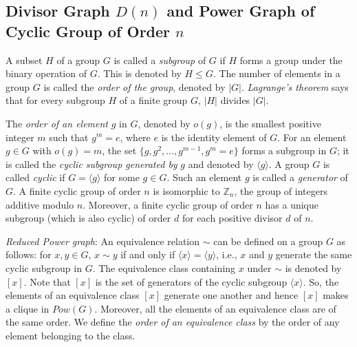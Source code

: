 \documentclass[twoside, 11pt]{article}
\begin{document}


\subsection{Divisor Graph $D(n)$ and Power Graph of Cyclic Group of Order $n$}\label{divisor and power}

  A subset $H$ of a group $G$ is called a \textit{subgroup} of $G$ if $H$ forms a group under the binary operation of $G$. This is denoted by $H \leq G$. The number of elements in a group $G$ is called the \textit{order of the group}, denoted by $|G|$. \textit{Lagrange's theorem} says that for every subgroup $H$ of a finite group $G$, $|H|$ divides $|G|$. 

The \textit{order of an element} $g$ in $G$, denoted by $o(g)$, is the smallest positive integer $m$ such that $g^m=e$, where $e$ is the identity element of $G$. For an element $g \in G$ with $o(g)=m$, the set $\{g, g^2, \dots, g^{m-1}, g^m=e\}$ forms a subgroup in $G$; it is called the \textit{cyclic subgroup generated by} $g$ and denoted by $\langle g \rangle$.
A group $G$ is called \emph{cyclic} if $G=\langle g \rangle$ for some $g\in G$. Such an element $g$ is called a \textit{generator} of $G$. A finite cyclic group of order $n$ is isomorphic to $\mathbb{Z}_n$, the group of integers additive modulo $n$. Moreover, a finite cyclic group of order $n$ has a unique subgroup (which is also cyclic) of order $d$ for each positive divisor $d$ of $n$.

\vspace{0.2cm}
 

\noindent \textit{Reduced Power graph}: 
An equivalence relation $\sim$ can be defined on a group $G$ as follows: for $x,y\in G$, $x\sim y$ if and only if $\langle x \rangle = \langle y \rangle$, i.e., $x$ and $y$ generate the same cyclic subgroup in $G$.  The equivalence class containing $x$ under $\sim$ is denoted by $[x]$. Note that $[x]$ is the set of generators of the cyclic subgroup $\langle x \rangle$. So, the elements of an equivalence class $[x]$ generate one another and hence $[x]$ makes a clique in $Pow(G)$. Moreover, all the elements of an equivalence class are of the same order. We define the \emph{order of an equivalence class} by the order of any element belonging to the class. 
\end{document}

